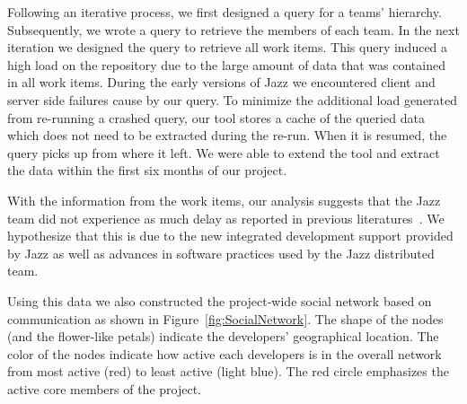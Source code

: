 Following an iterative process, we first designed a query for a teams' hierarchy.
Subsequently, we wrote a query to retrieve the members of each team. In
the next iteration we designed the query to retrieve all work items. This query
induced a high load on the repository due to the large amount of data that was
contained in all work items. During the early versions of Jazz we encountered
client and server side failures cause by our query. To minimize the additional
load generated from re-running a crashed query, our tool stores a cache of the
queried data which does not need to be extracted during the re-run. When it is
resumed, the query picks up from where it left. We were able to extend the tool
and extract the data within the first six months of our project.

With the information from the work items, our analysis suggests that
the Jazz team did not experience as much delay as reported in previous
literatures~\cite{Battin:2001tb,Herbsleb:2003oo}. We hypothesize that this is due
to the new integrated development support provided by Jazz as well as advances
in software practices used by the Jazz distributed team.

Using this data we also constructed the project-wide social network based on communication as shown in Figure~\ref{fig:SocialNetwork}. The shape of the nodes (and the flower-like petals) indicate the developers' geographical location. The color of the nodes indicate how active each developers is in the overall network from most active (red) to least active (light blue). The red circle emphasizes the active core members of the project.